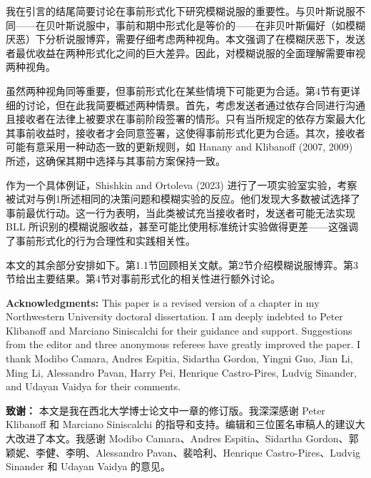 \documentclass[12pt,a4paper]{article}
\theoremstyle{definition}
\theoremstyle{remark}
\newenvironment{original}{%
    \par\medskip\noindent%
    \begin{tcolorbox}[%
        colback=white,%
        colframe=black!50,%
        title=\textbf{Original English},%
        fonttitle=\small\bfseries,%
        left=0pt, right=0pt, top=2pt, bottom=2pt,%
        boxrule=0.5pt,%
        arc=0pt,%
        outer arc=0pt%
    ]%
    \small%
}{%
    \end{tcolorbox}%
}
\newenvironment{translation}{%
    \par\smallskip\noindent%
    \begin{tcolorbox}[%
        colback=blue!3!white,%
        colframe=blue!40!black,%
        title=\textbf{中文翻译},%
        fonttitle=\small\bfseries,%
        left=0pt, right=0pt, top=2pt, bottom=2pt,%
        boxrule=0.5pt,%
        arc=0pt,%
        outer arc=0pt%
    ]%
    \small\color{blue!60!black}%
}{%
    \end{tcolorbox}\medskip%
}
\begin{document}
\begin{translation}
我在引言的结尾简要讨论在事前形式化下研究模糊说服的重要性。与贝叶斯说服不同——在贝叶斯说服中，事前和期中形式化是等价的——在非贝叶斯偏好（如模糊厌恶）下分析说服博弈，需要仔细考虑两种视角。本文强调了在模糊厌恶下，发送者最优收益在两种形式化之间的巨大差异。因此，对模糊说服的全面理解需要审视两种视角。

虽然两种视角同等重要，但事前形式化在某些情境下可能更为合适。第4节有更详细的讨论，但在此我简要概述两种情景。首先，考虑发送者通过依存合同进行沟通且接收者在法律上被要求在事前阶段签署的情形。只有当所规定的依存方案最大化其事前收益时，接收者才会同意签署，这使得事前形式化更为合适。其次，接收者可能有意采用一种动态一致的更新规则，如 Hanany and Klibanoff (2007, 2009) 所述，这确保其期中选择与其事前方案保持一致。

作为一个具体例证，Shishkin and Ortoleva (2023) 进行了一项实验室实验，考察被试对与例1所述相同的决策问题和模糊实验的反应。他们发现大多数被试选择了事前最优行动。这一行为表明，当此类被试充当接收者时，发送者可能无法实现 BLL 所识别的模糊说服收益，甚至可能比使用标准统计实验做得更差——这强调了事前形式化的行为合理性和实践相关性。

本文的其余部分安排如下。第1.1节回顾相关文献。第2节介绍模糊说服博弈。第3节给出主要结果。第4节对事前形式化的相关性进行额外讨论。
\end{translation}

\begin{original}
\smallskip
\noindent\textbf{Acknowledgments:} This paper is a revised version of a chapter in my Northwestern University doctoral dissertation. I am deeply indebted to Peter Klibanoff and Marciano Siniscalchi for their guidance and support. Suggestions from the editor and three anonymous referees have greatly improved the paper. I thank Modibo Camara, Andres Espitia, Sidartha Gordon, Yingni Guo, Jian Li, Ming Li, Alessandro Pavan, Harry Pei, Henrique Castro-Pires, Ludvig Sinander, and Udayan Vaidya for their comments.
\end{original}
\begin{translation}
\textbf{致谢：} 本文是我在西北大学博士论文中一章的修订版。我深深感谢 Peter Klibanoff 和 Marciano Siniscalchi 的指导和支持。编辑和三位匿名审稿人的建议大大改进了本文。我感谢 Modibo Camara、Andres Espitia、Sidartha Gordon、郭颖妮、李健、李明、Alessandro Pavan、裴哈利、Henrique Castro-Pires、Ludvig Sinander 和 Udayan Vaidya 的意见。
\end{translation}

\end{document}
